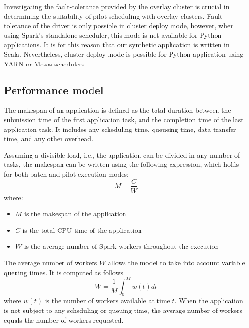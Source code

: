 \documentclass{IEEEtran}
\newcommand{\todo}[1]{\marginpar{\parbox{18mm}{\flushleft\tiny\color{red}\textbf{TODO}:
      #1}}}
\begin{document}
    Investigating the fault-tolerance provided by the overlay cluster is
    crucial in determining the suitability of pilot scheduling with overlay clusters.
    Fault-tolerance of the driver is only possible in cluster deploy mode, however,
    when using Spark's standalone scheduler, this mode is not available for Python 
    applications. It is for this reason that our synthetic application is written
    in Scala. Nevertheless, cluster deploy mode is possible for Python application
    using YARN or Mesos schedulers.

    
   
    \todo{walltime parameter of workflow}

    \subsection{Performance model}

    The makespan of an application is defined as the total duration
    between the submission time of the first application task, and the
    completion time of the last application task. It includes any
    scheduling time, queueing time, data transfer time, and any other
    overhead.
    
    Assuming a divisible load, i.e., the application can be divided in any
    number of tasks, the makespan can be written using the following
    expression, which holds for both batch and pilot execution modes:
    \begin{equation}
        M = \frac{C}{W} \label{eq:mcw}
    \end{equation}
    where:
    \begin{itemize}
        \item $M$ is the makespan of the application
        \item $C$ is the total CPU time of the application
        \item $W$ is the average number of Spark workers throughout the execution
    \end{itemize}
    The average number of workers $W$ allows the model to take into account
     variable queuing times. It is computed as follows:
    \begin{equation}
        W = \frac{1}{M}\int_0^M{w(t)dt}\label{eq:avgw}
    \end{equation}
    where $w(t)$ is the number of workers available at time $t$. When the
    application is not subject to any scheduling or queuing time, the
    average number of workers equals the number of workers requested. 
\end{document}
